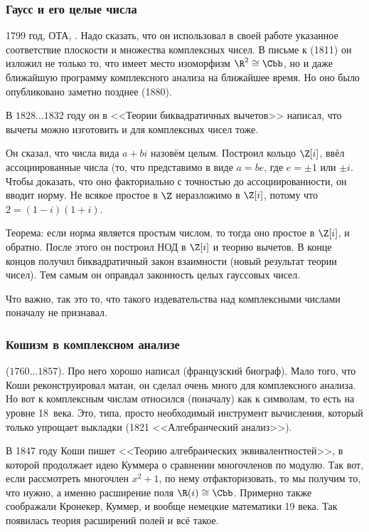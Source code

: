 \documentclass[a4paper,oneside,fleqn,10pt]{article}
\newcommand{\pe}[2]{${#1}\ldots{#2}$}
\begin{document}
\subsubsection{Гаусс и его целые числа}

1799 год, ОТА, . Надо сказать, что он использовал в своей работе
указанное соответствие плоскости и множества комплексных чисел.
В письме к  (1811) он изложил не только то, что имеет
место изоморфизм $\R^2 \cong \Cbb$, но и даже ближайшую программу комплексного анализа
на ближайшее время. Но оно было опубликовано заметно позднее (1880).

В \pe{1828}{1832} году он в <<Теории биквадратичных вычетов>> написал, что вычеты
можно изготовить и для комплексных чисел тоже.

Он сказал, что числа вида $a+ bi$ назовём целым. Построил кольцо $\Z[i]$,
ввёл ассоциированные числа (то, что представимо в виде $a = be$, где $e = \pm1$ или $\pm i$.
Чтобы доказать, что оно факториально с точностью до ассоциированности, он вводит норму.
Не всякое простое в $\Z$ неразложимо в $\Z[i]$, потому что $2 = (1-i)(1+i)$.

Теорема: если норма является простым числом, то тогда оно простое в $\Z[i]$, и обратно.
После этого он построил НОД в $\Z[i]$ и теорию вычетов. В конце концов получил
биквадратичный закон взаимности (новый результат теории чисел).
Тем самым он оправдал законность целых гауссовых чисел.

Что важно, так это то, что  такого издевательства над комплексными
числами поначалу не признавал.

\subsubsection{Кошизм в комплексном анализе}

 (\pe{1760}{1857}).
Про него  хорошо написал  (французский биограф).
Мало того, что Коши реконструировал матан, он сделал очень много
для комплексного анализа. Но вот к комплексным числам
относился (поначалу) как к символам, то есть на уровне 18~века.
Это, типа, просто необходимый инструмент вычисления, который только упрощает
выкладки (1821 <<Алгебраический анализ>>).

В 1847 году Коши пишет <<Теорию алгебраических эквивалентностей>>, в которой
продолжает идею Куммера о сравнении многочленов по модулю.
Так вот, если рассмотреть многочлен $x^2+1$, по нему отфакторизовать, то мы получим
то, что нужно, а именно расширение поля $\R(i) \cong \Cbb$.
Примерно также соображали Кронекер, Куммер, и вообще немецкие математики
19 века. Так появилась теория расширений полей и всё такое.
\end{document}
